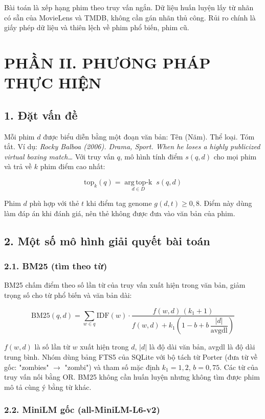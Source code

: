 \documentclass[12pt,a4paper]{article}
\let\oldsubsection\subsection
\renewcommand{\subsection}{\Needspace{12\baselineskip}\oldsubsection}
\let\oldsubsubsection\subsubsection
\renewcommand{\subsubsection}{\Needspace{10\baselineskip}\oldsubsubsection}
\newcommand{\chap}[1]{\clearpage\section{#1}}
\begin{document}
Bài toán là xếp hạng phim theo truy vấn ngắn. Dữ liệu huấn luyện lấy từ nhãn có sẵn của MovieLens và TMDB, không cần gán nhãn thủ công. Rủi ro chính là giấy phép dữ liệu và thiên lệch về phim phổ biến, phim cũ.

\chap{PHẦN II. PHƯƠNG PHÁP THỰC HIỆN}

\subsection{1. Đặt vấn đề}

Mỗi phim $d$ được biểu diễn bằng một đoạn văn bản: Tên (Năm). Thể loại. Tóm tắt. Ví dụ: \emph{Rocky Balboa (2006). Drama, Sport. When he loses a highly publicized virtual boxing match\ldots{}} Với truy vấn $q$, mô hình tính điểm $s(q,d)$ cho mọi phim và trả về $k$ phim điểm cao nhất:

\[
\mathrm{top}_k(q) = \operatorname*{arg\,top\text{-}k}_{d \in D}\; s(q,d)
\]

Phim $d$ phù hợp với thẻ $t$ khi điểm tag genome $g(d,t) \geq 0{,}8$. Điểm này dùng làm đáp án khi đánh giá, nên thẻ không được đưa vào văn bản của phim.

\subsection{2. Một số mô hình giải quyết bài toán}

\subsubsection{2.1. BM25 (tìm theo từ)}

BM25 chấm điểm theo số lần từ của truy vấn xuất hiện trong văn bản, giảm trọng số cho từ phổ biến và văn bản dài:

\[
\mathrm{BM25}(q,d)=\sum_{w\in q}\mathrm{IDF}(w)\cdot
\frac{f(w,d)\,(k_1+1)}{f(w,d)+k_1\left(1-b+b\,\dfrac{|d|}{\mathrm{avgdl}}\right)}
\]

$f(w,d)$ là số lần từ $w$ xuất hiện trong $d$, $|d|$ là độ dài văn bản, avgdl là độ dài trung bình. Nhóm dùng bảng FTS5 của SQLite với bộ tách từ Porter (đưa từ về gốc: "zombies" $\rightarrow$ "zombi") và tham số mặc định $k_1 = 1{,}2$, $b = 0{,}75$. Các từ của truy vấn nối bằng OR. BM25 không cần huấn luyện nhưng không tìm được phim mô tả cùng ý bằng từ khác.

\subsubsection{2.2. MiniLM gốc (all-MiniLM-L6-v2)}
\end{document}

